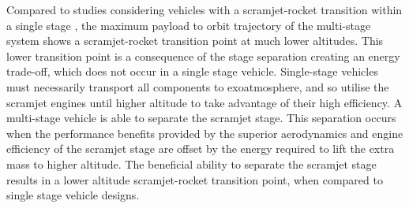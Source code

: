 \documentclass[]{aiaa-tc}
\begin{document}
 
 Compared to studies considering vehicles with a scramjet-rocket transition within a single stage \cite{Lu1993}\cite{Trefny1999}, the maximum payload to orbit trajectory of the multi-stage system shows a scramjet-rocket transition point at much lower altitudes.
 This lower transition point is a consequence of the stage separation creating an energy trade-off, which does not occur in a single stage vehicle. Single-stage vehicles must necessarily transport all components to exoatmosphere, and so utilise the scramjet engines until higher altitude to take advantage of their high efficiency. A multi-stage vehicle is able to separate the scramjet stage. 
This separation occurs when the performance benefits provided by the superior aerodynamics and engine efficiency of the scramjet stage are offset by the energy required to lift the extra mass to higher altitude. The beneficial ability
to separate the scramjet stage results in a lower altitude scramjet-rocket transition point, when compared to single
stage vehicle designs.
\end{document}
